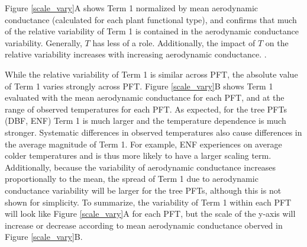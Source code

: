 \documentclass[draft,linenumbers]{agujournal}
\begin{document}
Figure \ref{scale_vary}A shows Term 1 normalized by mean aerodynamic conductance (calculated for each plant functional type), and confirms that much of the relative variability of Term 1 is contained in the aerodynamic conductance variability. Generally, $T$ has less of a role. Additionally, the impact of $T$ on the relative variability increases with increasing aerodynamic conductance. .

While the relative variability of Term 1 is similar across PFT, the absolute value of Term 1 varies strongly across PFT. Figure \ref{scale_vary}B shows Term 1 evaluated with the mean aerodynamic conductance for each PFT, and at the range of observed temperatures for each PFT. As expected, for the tree PFTs (DBF, ENF) Term 1 is much larger and the temperature dependence is much stronger. Systematic differences in observed temperatures also cause differences in the average magnitude of Term 1. For example, ENF experiences on average colder temperatures and is thus more likely to have a larger scaling term. Additionally, because the variability of aerodynamic conductance increases proportionally to the mean, the spread of Term 1 due to aerodynamic conductance variability will be larger for the tree PFTs, although this is not shown for simplicity. To summarize, the variability of Term 1 within each PFT will look like Figure \ref{scale_vary}A for each PFT, but the scale of the y-axis will increase or decrease according to mean aerodynamic conductance oberved in Figure \ref{scale_vary}B.
 
\end{document}
